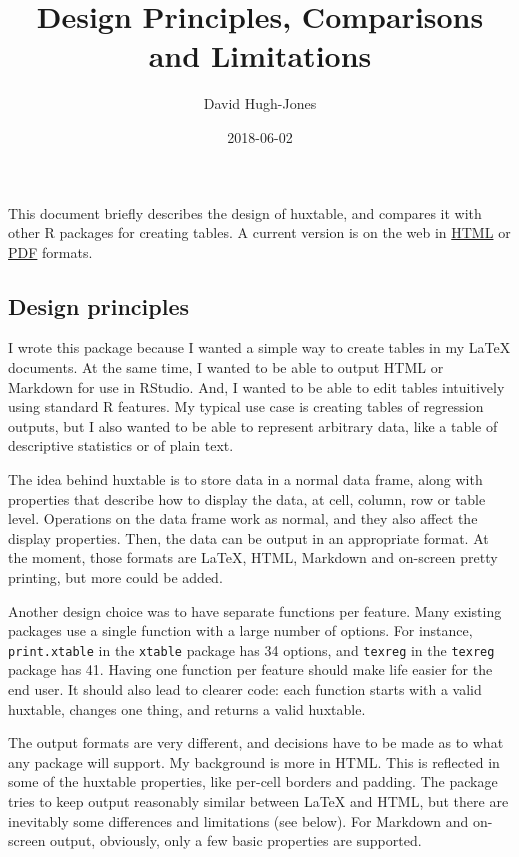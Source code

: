 \documentclass[]{article}
\title{Design Principles, Comparisons and Limitations}
\author{David Hugh-Jones}
\date{2018-06-02}
\begin{document}
\maketitle

This document briefly describes the design of huxtable, and compares it
with other R packages for creating tables. A current version is on the
web in
\href{http://hughjonesd.github.io/huxtable/design-principles.html}{HTML}
or
\href{http://hughjonesd.github.io/huxtable/design-principles.pdf}{PDF}
formats.

\subsection{Design principles}\label{design-principles}

I wrote this package because I wanted a simple way to create tables in
my LaTeX documents. At the same time, I wanted to be able to output HTML
or Markdown for use in RStudio. And, I wanted to be able to edit tables
intuitively using standard R features. My typical use case is creating
tables of regression outputs, but I also wanted to be able to represent
arbitrary data, like a table of descriptive statistics or of plain text.

The idea behind huxtable is to store data in a normal data frame, along
with properties that describe how to display the data, at cell, column,
row or table level. Operations on the data frame work as normal, and
they also affect the display properties. Then, the data can be output in
an appropriate format. At the moment, those formats are LaTeX, HTML,
Markdown and on-screen pretty printing, but more could be added.

Another design choice was to have separate functions per feature. Many
existing packages use a single function with a large number of options.
For instance, \texttt{print.xtable} in the \texttt{xtable} package has
34 options, and \texttt{texreg} in the \texttt{texreg} package has 41.
Having one function per feature should make life easier for the end
user. It should also lead to clearer code: each function starts with a
valid huxtable, changes one thing, and returns a valid huxtable.

The output formats are very different, and decisions have to be made as
to what any package will support. My background is more in HTML. This is
reflected in some of the huxtable properties, like per-cell borders and
padding. The package tries to keep output reasonably similar between
LaTeX and HTML, but there are inevitably some differences and
limitations (see below). For Markdown and on-screen output, obviously,
only a few basic properties are supported.
\end{document}
